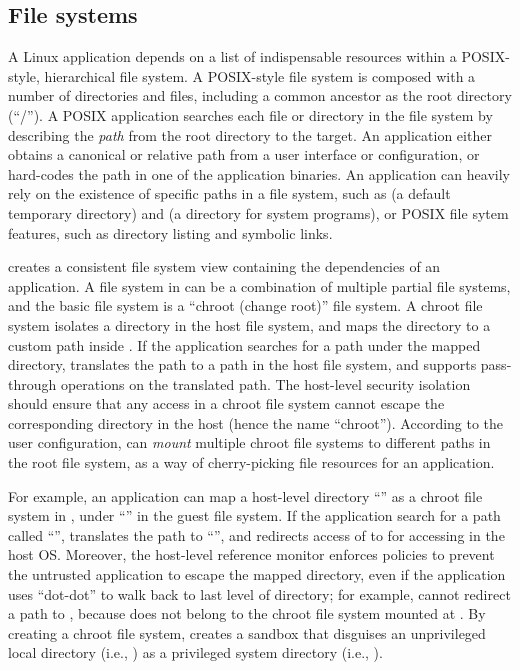 \subsection{File systems}
\label{sec:libos:fs}


A Linux application depends on a list of indispensable resources
within a POSIX-style, hierarchical file system.
A POSIX-style file system is composed with a number of directories and files, including a common ancestor as the root directory (``/'').
A POSIX application searches each file or directory in the file system
by describing the {\em path} %
from the root directory to the target. %
An application either obtains a canonical or relative path
from a user interface or configuration,
or hard-codes the path in one of the application binaries.
An application can heavily rely on the existence of specific paths in a file system,
such as  (a default temporary directory)
and  (a directory for system programs),
or POSIX file sytem features,
such as directory listing and symbolic links.



\thelibos{} creates a consistent file system view containing the dependencies of an application.
A file system in \thelibos{} can be a combination of multiple 
partial file systems,
and the basic file system is a ``chroot (change root)'' file system.
A chroot file system isolates a directory in the host file system,
and maps the directory
to a custom path inside \thelibos{}.
If the application searches for a path under the mapped directory,
\thelibos{} translates the path to a path in the host file system, and supports pass-through operations on the translated path.
The host-level security isolation
should ensure that any access in a chroot file system cannot escape the corresponding directory in the host (hence the name ``chroot''). 
According to the user configuration, \thelibos{} can {\em mount} multiple chroot file systems to different paths in the root file system,
as a way of cherry-picking file resources for an application.



For example, an application can map a host-level directory ``'' as a chroot file system in \thelibos{}, under ``'' in the guest file system.
If the application search for a path called ``'', \thelibos{} translates the path to ``'', and redirects access of  to \hostapis{} for accessing  in the host OS.
Moreover, the host-level reference monitor enforces policies
to prevent the untrusted application
to escape the mapped directory, even if the application uses ``dot-dot'' to walk back to last level of directory; for example, \thelibos{} cannot redirect a path  to , because  does not belong to the chroot file system mounted at .
By creating a chroot file system, \thelibos{} creates a sandbox that disguises an unprivileged local directory (i.e., )
as a privileged system directory (i.e., ).





